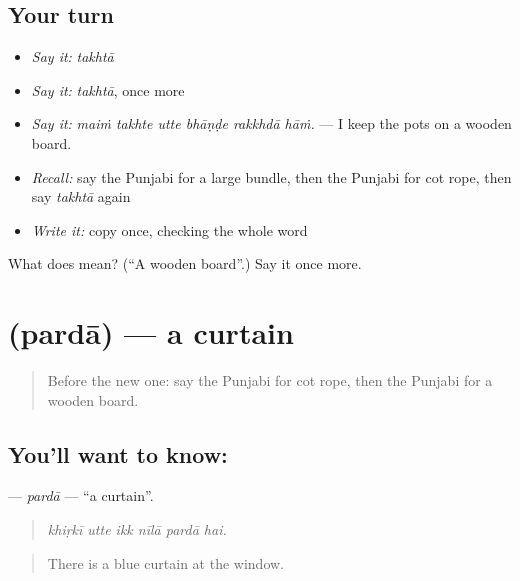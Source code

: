 \subsection*{Your turn}
\begin{itemize}
\raggedright
  \item \emph{Say it:} \emph{takhtā}
  \item \emph{Say it:} \emph{takhtā}, once more
  \item \emph{Say it:} \emph{maiṁ takhte utte bhāṇḍe rakkhdā hāṁ.} — I keep the pots on a wooden board.
  \item \emph{Recall:} say the Punjabi for a large bundle, then the Punjabi for cot rope, then say \emph{takhtā} again
  \item \emph{Write it:} copy \textbf{} once, checking the whole word
\end{itemize}

\begin{tcolorbox}[breakable,colback=teal!4,colframe=teal!35!black,title={Before you move on}]
What does  mean? (\textquotedblleft{}A wooden board\textquotedblright{}.) Say it once more.
\end{tcolorbox}
\section[\texorpdfstring{\pa{ਪਰਦਾ} (pardā)}{ਪਰਦਾ (pardā)}]{ (pardā) — a curtain}

\label{lesson:PA-C252-parda}



\begin{quote}
Before the new one: say the Punjabi for cot rope, then the Punjabi for a wooden board.
\end{quote}

\subsection*{You'll want to know: }
\textbf{} — \emph{pardā} — \textquotedblleft{}a curtain\textquotedblright{}.

\begin{quote}
     
\end{quote}

\begin{quote}
\emph{khiṛkī utte ikk nīlā pardā hai.}
\end{quote}

\begin{quote}
There is a blue curtain at the window.
\end{quote}

